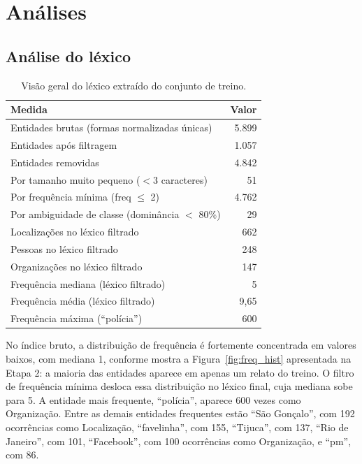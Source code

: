 \documentclass[12pt,a4paper]{article}
\begin{document}
\section{Análises}

\subsection{Análise do léxico}

\begin{table}[H]
\centering
\caption{Visão geral do léxico extraído do conjunto de treino.}
\label{tab:lexico}
\begin{tabular}{lr}
\toprule
\textbf{Medida} & \textbf{Valor} \\
\midrule
Entidades brutas (formas normalizadas únicas)         & 5.899 \\
Entidades após filtragem                              & 1.057 \\
Entidades removidas                                   & 4.842 \\
\quad Por tamanho muito pequeno (${<}$3 caracteres)    &    51 \\
\quad Por frequência mínima (freq $\leq$ 2)            & 4.762 \\
\quad Por ambiguidade de classe (dominância $<$ 80\%)  &    29 \\
\midrule
Localizações no léxico filtrado                       &   662 \\
Pessoas no léxico filtrado                            &   248 \\
Organizações no léxico filtrado                       &   147 \\
\midrule
Frequência mediana (léxico filtrado)                  &     5 \\
Frequência média (léxico filtrado)                    &  9,65 \\
Frequência máxima (``polícia'')                       &   600 \\
\bottomrule
\end{tabular}
\end{table}

No índice bruto, a distribuição de frequência é fortemente concentrada em
valores baixos, com mediana 1, conforme mostra a Figura~\ref{fig:freq_hist}
apresentada na Etapa 2: a maioria das entidades aparece em apenas um relato
do treino. O filtro de frequência mínima desloca essa distribuição no léxico
final, cuja mediana sobe para 5. A entidade mais frequente, ``polícia'',
aparece 600 vezes como Organização. Entre as demais entidades frequentes
estão ``São Gonçalo'', com 192 ocorrências como Localização, ``favelinha'',
com 155, ``Tijuca'', com 137, ``Rio de Janeiro'', com 101, ``Facebook'', com
100 ocorrências como Organização, e ``pm'', com 86.
\end{document}
